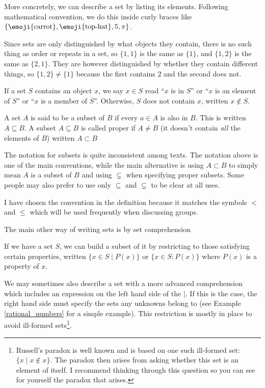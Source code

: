 More concretely, we can describe a set by listing its elements. Following mathematical convention, we do this inside curly braces like $\{\text{\emoji{carrot}},\text{\emoji{top-hat}},5, \pi\}$.
\begin{remark}
    Since sets are only distinguished by what objects they contain, there is no such thing as order or repeats in a set, so $\{1, 1\}$ is the same as $\{ 1 \}$, and $\{1,2\}$ is the same as $\{2,1\}$.
    They are however distinguished by whether they contain different things, so $\{1,2\} \ne \{1\}$ because the first contains 2 and the second does not.
\end{remark}
\begin{definition}[Containment]
    If a set $S$ contains an object $x$, we say $x \in S$ read ``$x$ is in $S$'' or ``$x$ is an element of $S$'' or ``$x$ is a member of $S$''. Otherwise, $S$ does not contain $x$, written $x\notin S$.
\end{definition}
\begin{definition}[Subsets]
    A set $A$ is said to be a subset of $B$ if every $a \in A$ is also in $B$. This is written $A \subseteq B$. A subset $A \subseteq B$ is called proper if $A \ne B$ (it doesn't contain \emph{all} the elements of $B$) written $A \subset B$
\end{definition}
\begin{remark}
    The notation for subsets is quite inconsistent among texts. The notation above is one of the main conventions, while the main alternative is using $A \subset B$ to simply mean $A$ is a subset of $B$ and using $\subsetneq$ when specifying proper subsets. Some people may also prefer to use only $\subseteq$ and $\subsetneq$ to be clear at all uses.

    \medskip\noindent
    I have chosen the convention in the definition because it matches the symbols $<$ and $\le$ which will be used frequently when discussing groups.
\end{remark}

\noindent
The main other way of writing sets is by set comprehension
\begin{definition}
    If we have a set $S$, we can build a subset of it by restricting to those satisfying certain properties, written $\{ x\in S \mid P(x) \}$ or $\{ x \in S \colon P(x) \}$ where $P(x)$ is a property of $x$.
\end{definition}
\begin{remark}
    We may sometimes also describe a set with a more advanced comprehension which includes an expression on the left hand side of the $\mid$. If this is the case, the right hand side must specify the sets any unknowns belong to (see Example \ref{rational_numbers} for a simple example). This restriction is mostly in place to avoid ill-formed sets\footnote{Russell's paradox is well known and is based on one such ill-formed set: $\{ x \mid x \notin x \}$. The paradox then arises from asking whether this set is an element of itself. I recommend thinking through this question so you can see for yourself the paradox that arises.}.
\end{remark}

